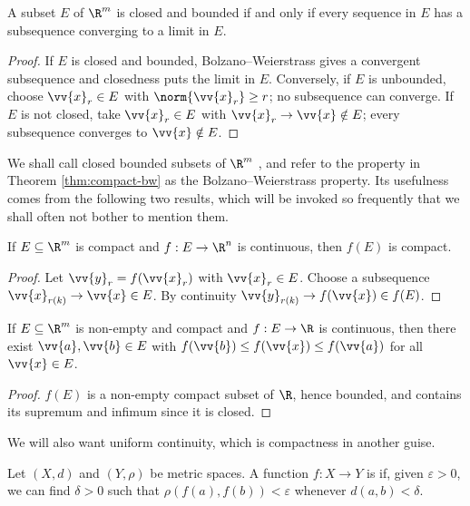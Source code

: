 \begin{theorem}\label{thm:compact-bw}
	A subset $E$ of $\R^m$ is closed and bounded if and only if every sequence in $E$ has a subsequence converging to a limit in $E$.
\end{theorem}

\begin{proof}
	If $E$ is closed and bounded, Bolzano--Weierstrass gives a convergent subsequence and closedness puts the limit in $E$. Conversely, if $E$ is unbounded, choose $\vv{x}_r \in E$ with $\norm{\vv{x}_r} \geq r$; no subsequence can converge. If $E$ is not closed, take $\vv{x}_r \in E$ with $\vv{x}_r \to \vv{x} \notin E$; every subsequence converges to $\vv{x} \notin E$.
\end{proof}

We shall call closed bounded subsets of $\R^m$ , and refer to the property in Theorem \ref{thm:compact-bw} as the Bolzano--Weierstrass property. Its usefulness comes from the following two results, which will be invoked so frequently that we shall often not bother to mention them.

\begin{theorem}
	If $E \subseteq \R^m$ is compact and $f : E \to \R^n$ is continuous, then $f(E)$ is compact.
\end{theorem}

\begin{proof}
	Let $\vv{y}_r = f(\vv{x}_r)$ with $\vv{x}_r \in E$. Choose a subsequence $\vv{x}_{r(k)} \to \vv{x} \in E$. By continuity $\vv{y}_{r(k)} \to f(\vv{x}) \in f(E)$.
\end{proof}

\begin{theorem}\label{thm:attains-bounds}
	If $E \subseteq \R^m$ is non-empty and compact and $f : E \to \R$ is continuous, then there exist $\vv{a}, \vv{b} \in E$ with $f(\vv{b}) \leq f(\vv{x}) \leq f(\vv{a})$ for all $\vv{x} \in E$.
\end{theorem}

\begin{proof}
	$f(E)$ is a non-empty compact subset of $\R$, hence bounded, and contains its supremum and infimum since it is closed.
\end{proof}

We will also want uniform continuity, which is compactness in another guise.

\begin{definition}
	Let $(X,d)$ and $(Y,\rho)$ be metric spaces. A function $f : X \to Y$ is  if, given $\varepsilon>0$, we can find $\delta>0$ such that $\rho(f(a),f(b)) < \varepsilon$ whenever $d(a,b) < \delta$.
\end{definition}

